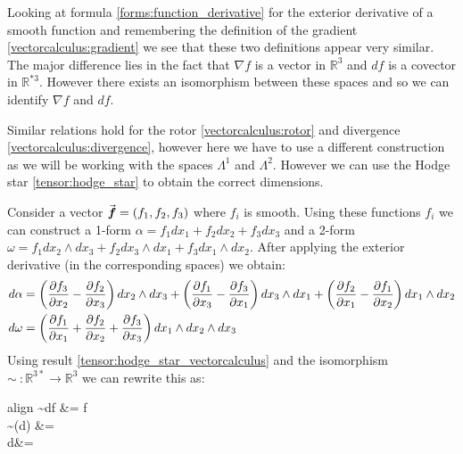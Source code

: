 	Looking at formula \ref{forms:function_derivative} for the exterior derivative of a smooth function and remembering the definition of the gradient \ref{vectorcalculus:gradient} we see that these two definitions appear very similar. The major difference lies in the fact that $\nabla f$ is a vector in $\mathbb{R}^3$ and $df$ is a covector in $\mathbb{R}^{*3}$. However there exists an isomorphism between these spaces and so we can identify $\nabla f$ and $df$.
		
		Similar relations hold for the rotor \ref{vectorcalculus:rotor} and divergence \ref{vectorcalculus:divergence}, however here we have to use a different construction as we will be working with the spaces $\Lambda^1$ and $\Lambda^2$. However we can use the Hodge star \ref{tensor:hodge_star} to obtain the correct dimensions.
		
		Consider a vector $\vec{\boldsymbol{f}} = (f_1, f_2, f_3)$ where $f_i$ is smooth. Using these functions $f_i$ we can construct a 1-form $\alpha = f_1dx_1 + f_2dx_2 + f_3dx_3$ and a 2-form $\omega = f_1dx_2\wedge dx_3 + f_2dx_3\wedge dx_1 + f_3 dx_1\wedge dx_2$. After applying the exterior derivative (in the corresponding spaces) we obtain:
		\begin{align}
			d\alpha &= \left(\frac{\partial f_3}{\partial x_2} - \frac{\partial f_2}{\partial x_3}\right)dx_2\wedge dx_3 + \left(\frac{\partial f_1}{\partial x_3} - \frac{\partial f_3}{\partial x_1}\right)dx_3\wedge dx_1 + \left(\frac{\partial f_2}{\partial x_1} - \frac{\partial f_1}{\partial x_2}\right)dx_1\wedge dx_2 \nonumber\\
			d\omega &= \left(\frac{\partial f_1}{\partial x_1} + \frac{\partial f_2}{\partial x_2} + \frac{\partial f_3}{\partial x_3}\right)dx_1\wedge dx_2\wedge dx_3 \nonumber
		\end{align}
		Using result \ref{tensor:hodge_star_vectorcalculus} and the isomorphism $\sim\ :\mathbb{R}^{3*}\rightarrow\mathbb{R}^3$ we can rewrite this as:
		\begin{empheq}[box=\fbox]{align}
			\sim df &= \nabla f \\
			\sim (\ast d\alpha) &= \nabla\times{} \\
			\ast d\omega &= \nabla\cdot{}
		\end{empheq}
